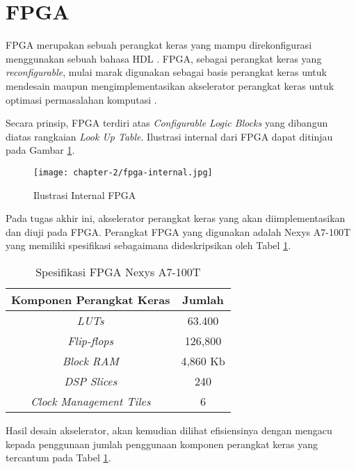 \section{\acl{FPGA}}
\label{sec:fpga}

\acf{FPGA} merupakan sebuah perangkat keras yang mampu direkonfigurasi menggunakan sebuah bahasa \ac{HDL} \parencite{smith2024FPGA}. \ac{FPGA}, sebagai perangkat keras yang \textit{reconfigurable}, mulai marak digunakan sebagai basis perangkat keras untuk mendesain maupun mengimplementasikan akselerator perangkat keras untuk optimasi permasalahan komputasi \parencite{gerlach2023fpgaplacement}.

Secara prinsip, \ac{FPGA} terdiri atas \textit{Configurable Logic Blocks} yang dibangun diatas rangkaian \textit{Look Up Table}. Ilustrasi internal dari \ac{FPGA} dapat ditinjau pada Gambar \ref{fig:ilustrasi-internal-fpga}.

\begin{figure}[h]
	\centering
	\texttt{[image: chapter-2/fpga-internal.jpg]}
	\caption{Ilustrasi Internal \ac{FPGA} \parencite{md2015field}}
	\label{fig:ilustrasi-internal-fpga}
\end{figure}

Pada tugas akhir ini, akselerator perangkat keras yang akan diimplementasikan dan diuji pada \ac{FPGA}. Perangkat \ac{FPGA} yang digunakan adalah Nexys A7-100T yang memiliki spesifikasi sebagaimana dideskripsikan oleh Tabel \ref{tab:nexys-specs}.

\begin{table}[h]
	\caption{Spesifikasi \ac{FPGA} Nexys A7-100T}
	\label{tab:nexys-specs}
	\vspace{0.25cm}
	\begin{center}
		\begin{tabular}{|c|c|}
			\hline
			Komponen Perangkat Keras        & Jumlah \tabularnewline
			\hline
			\textit{\ac{LUTs}}              & 63.400 \tabularnewline
			\textit{Flip-flops}             & 126,800 \tabularnewline
			\textit{Block \ac{RAM}}         & 4,860 Kb \tabularnewline
			\textit{DSP Slices}             & 240 \tabularnewline
			\textit{Clock Management Tiles} & 6 \tabularnewline
			\hline
		\end{tabular}
	\end{center}
\end{table}

Hasil desain akselerator, akan kemudian dilihat efisiensinya dengan mengacu kepada penggunaan jumlah penggunaan komponen perangkat keras yang tercantum pada Tabel \ref{tab:nexys-specs}.
